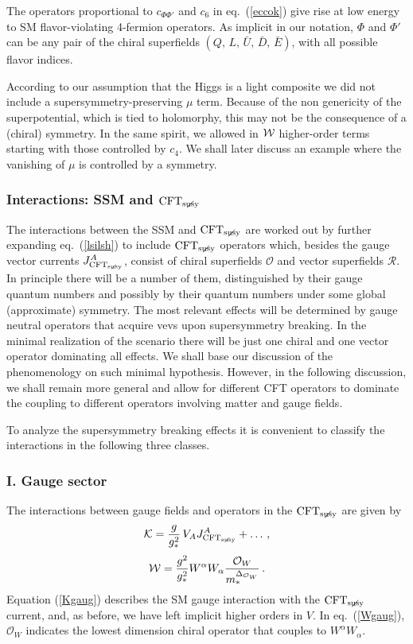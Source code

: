 \documentclass[a4paper,12pt]{article}
\newcommand{\beq}{\begin{equation}}
\newcommand{\eeq}{\end{equation}}
\def\eq#1{eq.~(\ref{#1})}
\def\eq#1{eq.~(\ref{#1})}
\def\O{\mathcal{O}}
\def\R{\mathcal{R}}
\def\mst{m_*}
\def\CFTs{{\rm CFT}_ {{\rm susy}\! \! \! \! \! \! \! \!\diagup \,\,\,}}
\begin{document}
The operators proportional to ${c}_{\Phi\Phi'}$ and ${ c}_6$ in \eq{eccok} give rise at low energy to SM flavor-violating 4-fermion operators. As implicit in our notation, $\Phi$ and $ \Phi'$ can be any pair of the chiral superfields $(Q,\,L,\,{\bar U}, \,{\bar D},\, \bar E)$, with all possible flavor indices.

According to our assumption that the Higgs is a light composite we did not include a supersymmetry-preserving $\mu$ term. 
Because of the non genericity of the superpotential, which is tied to holomorphy, this may not be the  consequence of a (chiral) symmetry. In the same spirit, we allowed in $\cal W$ higher-order terms starting with those controlled by $c_4$. We shall later discuss an example where the vanishing of $\mu$ is controlled by a symmetry.

\boldmath
\subsubsection*{Interactions: SSM  and $\CFTs$ }
\unboldmath
The interactions between the SSM  and $\CFTs$ are worked out by further expanding \eq{lsilsh} to include $\CFTs$ operators which, besides the gauge vector currents
$J_{\CFTs}^A$, consist of  chiral superfields $\O$ and vector superfields $\R$. In principle there will be a number of them, distinguished by their gauge quantum numbers  and possibly by their quantum numbers under some global (approximate) symmetry. The most relevant effects will be determined by gauge neutral operators that acquire vevs upon supersymmetry breaking. In the minimal realization of the scenario there will be just one chiral and one vector operator dominating all effects. We shall base our discussion of the phenomenology on such minimal hypothesis. However, in the following discussion, we shall remain more general and allow for different CFT operators to dominate the coupling to different operators involving matter and gauge fields.

To analyze the supersymmetry breaking effects it is convenient to classify the interactions in the following three classes.

\boldmath
\subsubsection*{I. Gauge sector}
\unboldmath
The interactions between gauge fields and operators in the $\CFTs$ are given by
\beq
{\cal K} =
\frac{g}{g_*^2}\, V_A J_{\CFTs}^A + \dots \, ,
\label{Kgaug}
\eeq
\beq
{\cal W} = \frac{g^2}{g_*^2} W^\alpha W_\alpha
\frac{\O_W}{\mst^{\Delta_{\O_W}}} \, .
\label{Wgaug}
\eeq
Equation (\ref{Kgaug}) describes the SM gauge interaction with the $\CFTs$ current, and, as before, we have left implicit higher orders in $V$. In \eq{Wgaug}, ${\O_W}$ indicates the lowest dimension chiral operator that couples to $W^\alpha W_\alpha$.
\end{document}
